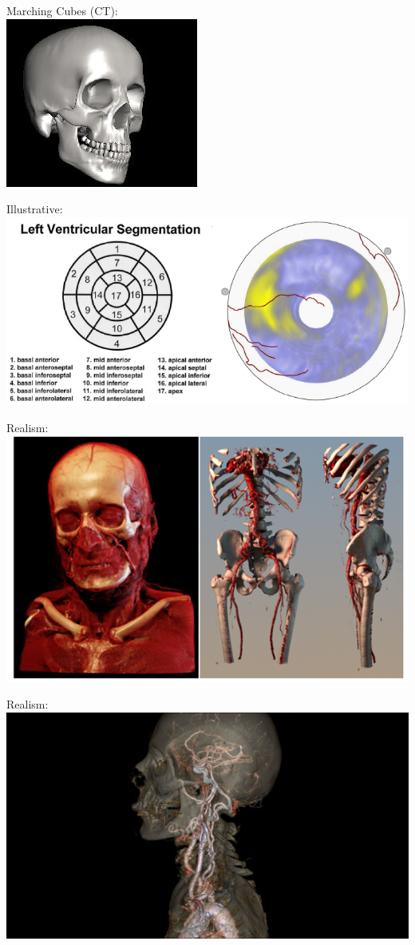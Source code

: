\documentclass{beamer}
\begin{document}
\begin{frame}
	Marching Cubes (CT):\\
	\includegraphics[width=.4\textwidth,height=.4\textheight]{images/marching}
\end{frame}

\begin{frame}
	Illustrative:
	\includegraphics[width=\textwidth]{images/heart}
\end{frame}

\begin{frame}
	Realism:
	\includegraphics[width=\textwidth]{images/medical_visualisation}
\end{frame}

\begin{frame}
	Realism:
	\includegraphics[width=\textwidth]{images/realistic_transparent}
\end{frame}
\end{document}
